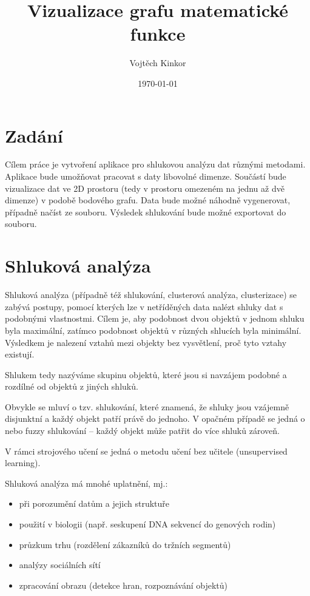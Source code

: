 \documentclass[pdftex,a4paper]{article}
\title{Vizualizace grafu matematické funkce}
\author{Vojtěch Kinkor}
\date{\today}
\newcommand*{\parvsp}{\par\vspace{\baselineskip}\noindent}
\begin{document}


\newpage
\tableofcontents
\newpage




\section{Zadání}

Cílem práce je vytvoření aplikace pro shlukovou analýzu dat různými metodami. Aplikace bude umožňovat pracovat s daty libovolné dimenze. Součástí bude vizualizace dat ve 2D prostoru (tedy v prostoru omezeném na jednu až dvě dimenze) v podobě bodového grafu. Data bude možné náhodně vygenerovat, případně načíst ze souboru. Výsledek shlukování bude možné exportovat do souboru.




\section{Shluková analýza}

Shluková analýza (případně též shlukování, clusterová analýza, clusterizace) se zabývá postupy, pomocí kterých lze v netříděných data nalézt shluky dat s podobnými vlastnostmi. Cílem je, aby podobnost dvou objektů v jednom shluku byla maximální, zatímco podobnost objektů v různých shlucích byla minimální. Výsledkem je nalezení vztahů mezi objekty bez vysvětlení, proč tyto vztahy existují.

Shlukem tedy nazýváme skupinu objektů, které jsou si navzájem podobné a rozdílné od objektů z jiných shluků.

Obvykle se mluví o tzv.  shlukování, které znamená, že shluky jsou vzájemně disjunktní a každý objekt patří právě do jednoho. V opačném případě se jedná o  nebo fuzzy shlukování -- každý objekt může patřit do více shluků zároveň.

V rámci strojového učení se jedná o metodu učení bez učitele (unsupervised learning).

\parvsp
Shluková analýza má mnohé uplatnění, mj.:
\begin{itemize}
	\item při porozumění datům a jejich struktuře
	\item použití v biologii (např. seskupení DNA sekvencí do genových rodin)
	\item průzkum trhu (rozdělení zákazníků do tržních segmentů)
	\item analýzy sociálních sítí
	\item zpracování obrazu (detekce hran, rozpoznávání objektů)
\end{itemize}
\end{document}
